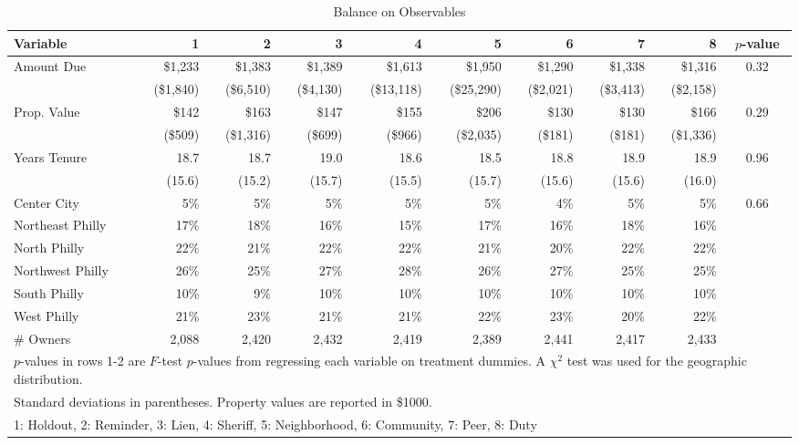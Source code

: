 \documentclass[12pt]{article}
\begin{document}
\begin{sidewaystable}[htbp]
\centering
\caption{Balance on Observables}
\label{balance}
\vspace{10mm}
\begin{tabular}{lrrrrrrrrc}
  \hline
Variable & 1 & 2 & 3 & 4 & 5 & 6 & 7 & 8 & $p$-value \\
   \hline
Amount Due & \$1,233 & \$1,383 & \$1,389 & \$1,613 & \$1,950 & \$1,290 & \$1,338 & \$1,316 & 0.32 \\
   & (\$1,840) & (\$6,510) & (\$4,130) & (\$13,118) & (\$25,290) & (\$2,021) & (\$3,413) & (\$2,158) &  \\
  Prop. Value & \$142 & \$163 & \$147 & \$155 & \$206 & \$130 & \$130 & \$166 & 0.29 \\
   & (\$509) & (\$1,316) & (\$699) & (\$966) & (\$2,035) & (\$181) & (\$181) & (\$1,336) &  \\
  Years Tenure & 18.7 & 18.7 & 19.0 & 18.6 & 18.5 & 18.8 & 18.9 & 18.9 & 0.96 \\
   & (15.6) & (15.2) & (15.7) & (15.5) & (15.7) & (15.6) & (15.6) & (16.0) &  \\
  Center City & 5\% & 5\% & 5\% & 5\% & 5\% & 4\% & 5\% & 5\% & 0.66 \\
  Northeast Philly & 17\% & 18\% & 16\% & 15\% & 17\% & 16\% & 18\% & 16\% &  \\
  North Philly & 22\% & 21\% & 22\% & 22\% & 21\% & 20\% & 22\% & 22\% &  \\
  Northwest Philly & 26\% & 25\% & 27\% & 28\% & 26\% & 27\% & 25\% & 25\% &  \\
  South Philly & 10\% &  9\% & 10\% & 10\% & 10\% & 10\% & 10\% & 10\% &  \\
  West Philly & 21\% & 23\% & 21\% & 21\% & 22\% & 23\% & 20\% & 22\% &  \\
  \# Owners & 2,088 & 2,420 & 2,432 & 2,419 & 2,389 & 2,441 & 2,417 & 2,433 &  \\
  \hline
\multicolumn{10}{l}{\scriptsize{$p$-values in rows 1-2 are $F$-test
    $p$-values from regressing each variable on treatment dummies. A
    $\chi^2$ test was used for the geographic distribution. }} \\
\multicolumn{10}{l}{\scriptsize{ Standard deviations in parentheses. Property values are reported in \$1000.  }} \\
\multicolumn{10}{l}{\scriptsize{1: Holdout, 2: Reminder, 3: Lien, 4: Sheriff, 5: Neighborhood, 6: Community, 7: Peer, 8: Duty}} \\
\end{tabular}
\end{sidewaystable}
\end{document}
